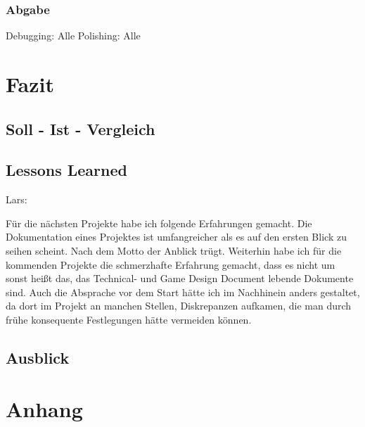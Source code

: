 \documentclass[12pt]{article}
\begin{document}
\vspace{1cm}
\subsubsection{Abgabe}

Debugging: Alle\newline
Polishing: Alle\newline

\newpage
\section{Fazit}

\vspace{2cm}
\subsection{Soll - Ist - Vergleich}

\vspace{2cm}
\subsection{Lessons Learned}

Lars:\newline

Für die nächsten Projekte habe ich folgende Erfahrungen gemacht. Die Dokumentation eines Projektes ist umfangreicher als es auf den ersten Blick zu
seihen scheint. Nach dem Motto der Anblick trügt. Weiterhin habe ich für die kommenden Projekte die schmerzhafte Erfahrung gemacht, dass es nicht um
sonst heißt das, das Technical- und Game Design Document lebende Dokumente sind. Auch die Absprache vor dem Start hätte ich im Nachhinein anders
gestaltet, da dort im Projekt an manchen Stellen, Diskrepanzen aufkamen, die man durch frühe konsequente Festlegungen hätte vermeiden können.

\vspace{2cm}
\subsection{Ausblick}

\section{Anhang}
\end{document}
